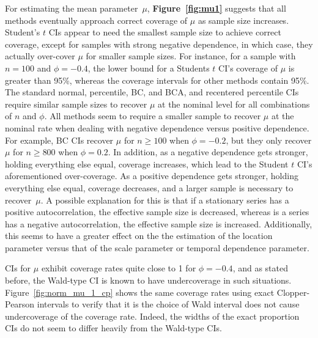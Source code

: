 \documentclass[10pt]{article}
\begin{document}
For estimating the mean parameter~$\mu$, \textbf{Figure~\ref{fig:mu1}} suggests 
that all methods eventually approach correct coverage of $\mu$ as sample size 
increases. Student's $t$ CIs appear to need the smallest sample size to achieve 
correct coverage, except for samples with strong negative dependence, in which 
case, they actually over-cover $\mu$ for smaller sample sizes. For instance, for 
a sample with $n = 100$ and $\phi = -0.4$, the lower bound for a Students $t$ 
CI's coverage of $\mu$ is greater than 95\%, whereas the coverage intervals for 
other methods contain 95\%. The standard normal, percentile, BC, and BCA, and 
recentered percentile CIs require similar sample sizes to recover $\mu$ at the 
nominal level for all combinations of $n$ and $\phi$. All methods seem to 
require a smaller sample to recover $\mu$ at the nominal rate when dealing with 
negative dependence versus positive dependence. For example, BC CIs recover 
$\mu$ for $n \geq 100$ when $\phi = -0.2$, but they only recover $\mu$ for 
$n \geq 800$ when $\phi = 0.2$. In addition, as a negative dependence gets 
stronger, holding everything else equal, coverage increases, which lead to the 
Student $t$ CI's aforementioned over-coverage. As a positive dependence gets 
stronger, holding everything else equal, coverage decreases, and a larger sample 
is necessary to recover~$\mu$. A possible explanation for this is that if a 
stationary series has a positive 
autocorrelation, the effective sample
size is decreased, whereas is a series has a negative autocorrelation, the
effective sample size is increased. Additionally, this seems to have a 
greater effect on the the estimation of the location parameter versus that
of the scale parameter or temporal dependence parameter.


CIs for $\mu$ exhibit coverage rates quite close to 1 for $\phi = -0.4$, and
as stated before, the Wald-type CI is known to have undercoverage in such 
situations.
Figure~\ref{fig:norm_mu_1_cp} shows the same coverage rates using exact 
Clopper-Pearson intervals to verify that it is the choice of Wald interval
does not cause undercoverage of the coverage rate. Indeed, the widths of the
exact proportion CIs do not seem to differ heavily from the Wald-type CIs.
\end{document}
